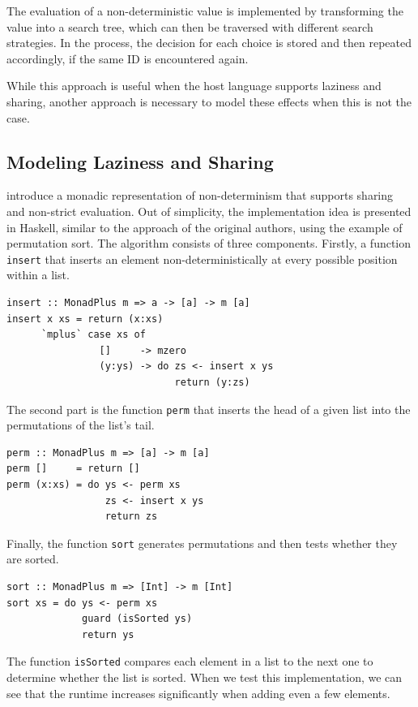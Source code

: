 \documentclass[a4paper, 11pt, fleqn, twoside]{scrreprt}
\newcommand{\hinl}[1]{\texttt{#1}}
\begin{document}
The evaluation of a non-deterministic value is implemented by transforming the value into a search tree, which can then be traversed with different search strategies.
In the process, the decision for each choice is stored and then repeated accordingly, if the same ID is encountered again.

While this approach is useful when the host language supports laziness and sharing, another approach is necessary to model these effects when this is not the case.

\subsection{Modeling Laziness and Sharing}
\label{subsec:monadicLifting}
\citet{fischer2009purely} introduce a monadic representation of non-determinism that supports sharing and non-strict evaluation.
Out of simplicity, the implementation idea is presented in Haskell, similar to the approach of the original authors, using the example of permutation sort.
The algorithm consists  of three components.
Firstly, a function \hinl{insert} that inserts an element non-deterministically at every possible position within a list.

\begin{verbatim}
insert :: MonadPlus m => a -> [a] -> m [a]
insert x xs = return (x:xs)
      `mplus` case xs of
                []     -> mzero
                (y:ys) -> do zs <- insert x ys
                             return (y:zs)
\end{verbatim}

The second part is the function \hinl{perm} that inserts the head of a given list into the permutations of the list's tail.

\begin{verbatim}
perm :: MonadPlus m => [a] -> m [a]
perm []     = return []
perm (x:xs) = do ys <- perm xs
                 zs <- insert x ys
                 return zs
\end{verbatim}

Finally, the function \hinl{sort} generates permutations and then tests whether they are sorted.

\begin{verbatim}
sort :: MonadPlus m => [Int] -> m [Int]
sort xs = do ys <- perm xs
             guard (isSorted ys)
             return ys
\end{verbatim}

The function \hinl{isSorted} compares each element in a list to the next one to determine whether the list is sorted.
When we test this implementation, we can see that the runtime increases significantly when adding even a few elements.
\end{document}
